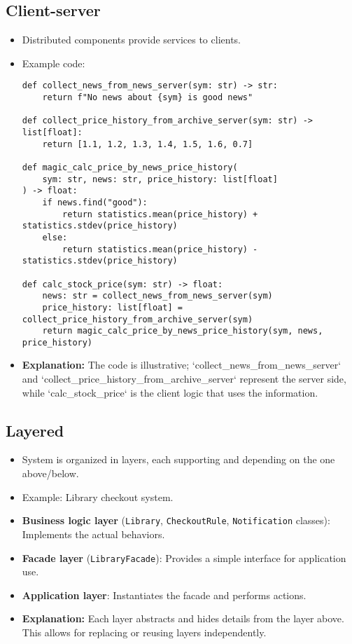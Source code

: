 \documentclass[11pt,a4paper]{article}
\begin{document}
\subsection*{Client-server}
\begin{itemize}
    \item Distributed components provide services to clients.
    \item Example code: 
    \begin{verbatim}
def collect_news_from_news_server(sym: str) -> str:
    return f"No news about {sym} is good news"

def collect_price_history_from_archive_server(sym: str) -> list[float]:
    return [1.1, 1.2, 1.3, 1.4, 1.5, 1.6, 0.7]

def magic_calc_price_by_news_price_history(
    sym: str, news: str, price_history: list[float]
) -> float:
    if news.find("good"):
        return statistics.mean(price_history) + statistics.stdev(price_history)
    else:
        return statistics.mean(price_history) - statistics.stdev(price_history)

def calc_stock_price(sym: str) -> float:
    news: str = collect_news_from_news_server(sym)
    price_history: list[float] = collect_price_history_from_archive_server(sym)
    return magic_calc_price_by_news_price_history(sym, news, price_history)
    \end{verbatim}
    \item \textbf{Explanation:} The code is illustrative; `collect_news_from_news_server` and `collect_price_history_from_archive_server` represent the server side, while `calc_stock_price` is the client logic that uses the information.
\end{itemize}

\subsection*{Layered}
\begin{itemize}
    \item System is organized in layers, each supporting and depending on the one above/below.
    \item Example: Library checkout system.
    \item \textbf{Business logic layer} (\texttt{Library}, \texttt{CheckoutRule}, \texttt{Notification} classes): Implements the actual behaviors.
    \item \textbf{Facade layer} (\texttt{LibraryFacade}): Provides a simple interface for application use.
    \item \textbf{Application layer}: Instantiates the facade and performs actions.
    \item \textbf{Explanation:} Each layer abstracts and hides details from the layer above. This allows for replacing or reusing layers independently.
\end{itemize}
\end{document}
